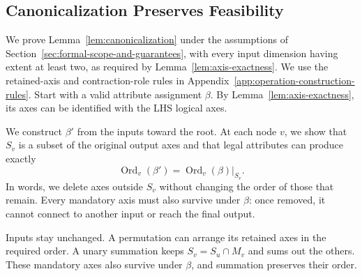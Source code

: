 \subsection{Canonicalization Preserves Feasibility}
\label{app:canonicalization-preserves-feasibility}
We prove Lemma~\ref{lem:canonicalization} under the assumptions of
Section~\ref{sec:formal-scope-and-guarantees}, with every input dimension having extent at least
two, as required by Lemma~\ref{lem:axis-exactness}. We use the retained-axis
and contraction-role rules in Appendix~\ref{app:operation-construction-rules}.
Start with a valid attribute assignment
$\beta$. By Lemma~\ref{lem:axis-exactness}, its axes can be identified
with the LHS logical axes.

We construct $\beta'$ from the inputs toward the root. At each node $v$,
we show that $S_v$ is a subset of the original output axes and that legal
attributes can produce exactly
\begin{equation}
 \operatorname{Ord}_v(\beta')=\operatorname{Ord}_v(\beta)|_{S_v}.
\end{equation}
In words, we delete axes outside $S_v$ without changing the order of those
that remain. Every mandatory axis must also survive under $\beta$:
once removed, it cannot connect to another input or reach the final output.

Inputs stay unchanged. A permutation can arrange its retained axes in
the required order. A unary summation keeps $S_v=S_u\cap M_v$ and sums
out the others. These mandatory axes also survive under $\beta$, and
summation preserves their order.

